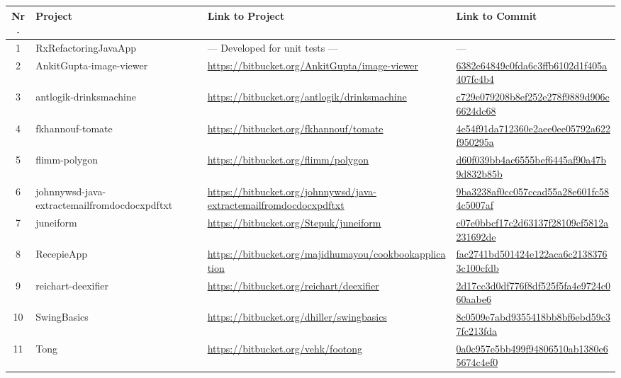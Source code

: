 \newcommand{\projectsHeader}{\bf Nr. & \bf Project & \bf Link to Project & \bf Link to Commit\\\hline}
\newcommand{\projectsEntry}[5]{#1 & #2 & \url{#3} & \href{#4}{#5}\\\hline}
{\scriptsize
\begin{longtable}{|c|p{4cm}|p{4.5cm}|p{6.5cm}|}
\hline
\projectsHeader
\endhead
1 & RxRefactoringJavaApp & --- Developed for unit tests --- & ---\\\hline\hline
\projectsEntry{2}{AnkitGupta-image-viewer}{https://bitbucket.org/AnkitGupta/image-viewer}{https://bitbucket.org/AnkitGupta/image-viewer/src/6382e64849c0fda6c3ffb6102d1f405a407fc4b4?at=master}{6382e64849c0fda6c3ffb6102d1f405a407fc4b4}
\projectsEntry{3}{antlogik-drinksmachine}{https://bitbucket.org/antlogik/drinksmachine}{https://bitbucket.org/antlogik/drinksmachine/src/c729e079208b8ef252e278f9889d906c6624dc68?at=default}{c729e079208b8ef252e278f9889d906c6624dc68}
\projectsEntry{4}{fkhannouf-tomate}{https://bitbucket.org/fkhannouf/tomate}{https://bitbucket.org/fkhannouf/tomate/src/4e54f91da712360e2aee0ee05792a622f950295a?at=master}{4e54f91da712360e2aee0ee05792a622f950295a}
\projectsEntry{5}{flimm-polygon}{https://bitbucket.org/flimm/polygon}{https://bitbucket.org/flimm/polygon/src/d60f039bb4ac6555bef6445af90a47b9d832b85b?at=master}{d60f039bb4ac6555bef6445af90a47b9d832b85b}
\projectsEntry{6}{johnnywsd-java-extractemailfromdocdocxpdftxt}{https://bitbucket.org/johnnywsd/java-extractemailfromdocdocxpdftxt}{https://bitbucket.org/johnnywsd/java-extractemailfromdocdocxpdftxt/src/9ba3238af0cc057ccad55a28e601fc584c5007af?at=master}{9ba3238af0cc057ccad55a28e601fc584c5007af}
\projectsEntry{7}{juneiform}{https://bitbucket.org/Stepuk/juneiform}{https://bitbucket.org/Stepuk/juneiform/src/c07e0bbcf17c2d63137f28109cf5812a231692de?at=default}{c07e0bbcf17c2d63137f28109cf5812a231692de}
\projectsEntry{8}{RecepieApp}{https://bitbucket.org/majidhumayou/cookbookapplication}{https://bitbucket.org/majidhumayou/cookbookapplication/src/fac2741bd501424e122aca6c21383763c100cfdb?at=default}{fac2741bd501424e122aca6c21383763c100cfdb}
\projectsEntry{9}{reichart-deexifier}{https://bitbucket.org/reichart/deexifier}{https://bitbucket.org/reichart/deexifier/src/2d17cc3d0df776f8df525f5fa4e9724c060aabe6?at=master}{2d17cc3d0df776f8df525f5fa4e9724c060aabe6}
\projectsEntry{10}{SwingBasics}{https://bitbucket.org/dhiller/swingbasics}{https://bitbucket.org/dhiller/swingbasics/src/8c0509e7abd9355418bb8bf6ebd59c37fc213fda?at=default}{8c0509e7abd9355418bb8bf6ebd59c37fc213fda}
\projectsEntry{11}{Tong}{https://bitbucket.org/vehk/footong}{https://bitbucket.org/vehk/footong/src/0a0c957e5bb499f94806510ab1380e65674c4ef0?at=default}{0a0c957e5bb499f94806510ab1380e65674c4ef0}\hline

\end{longtable}}
